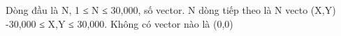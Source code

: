 Dòng đầu là N, 1 ≤ N ≤ 30,000, số vector. N dòng tiếp theo là N vecto (X,Y) -30,000 ≤ X,Y ≤ 30,000. Không có vector nào là (0,0)  

\